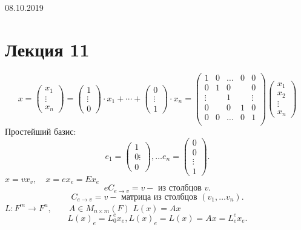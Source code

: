 \documentclass[12pt]{report}
\begin{document}
08.10.2019
\section{Лекция 11}
$$
x = 
 \left ( 
\begin{array}{c}
x_1 \\ \vdots \\x_n 
\end{array}
\right )
= \left ( 
\begin{array}{c}
1 \\ \vdots \\ 0
\end{array}
\right )\cdot x_1 + \cdots + \left ( 
\begin{array}{c}
0 \\ \vdots \\ 1
\end{array}
\right ) \cdot x_n = 
\left ( 
\begin{array}{ccccc}
    1 & 0  & \ldots & 0 & 0 \\
    0 & 1  & 0 & & 0\\
    \vdots & & 1 & & \vdots \\
    0 &  & 0 & 1 & 0\\
    0 & 0  & \ldots & 0 & 1 \\
\end{array}
\right )
\left ( 
\begin{array}{c}
    x_1 \\ x_2 \\ \vdots \\ x_n
\end{array}
\right )
$$
Простейший базис:
\[
e_1 = 
\left ( 
\begin{array}{c}
1 \\ 0 \vdots \\ 0
\end{array}
\right )
, \ldots e_n = \left ( 
\begin{array}{c}
0 \\ 0 \\ \vdots \\ 1
\end{array}
\right )

.\] 
$x = v x_v, \quad x = e x_e = E x_e$\\
 \[
     e C_{e \to v} = v - \mbox{ из столбцов } v
.\] 
\[
    C_{e \to v} = v - \mbox{ матрица из столбцов } (v_1, \ldots v_n)
.\] 
$L: F^m \to F^n , \qquad A \in M_{n \times m}(F)$
$L(x) = A x$\\
 \[
     L(x)_e = L_0^e x_e , L(x)_e = L(x) = Ax = L_e ^e x_e
.\] 
\end{document}
